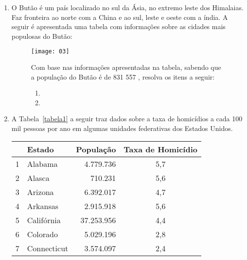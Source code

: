 \documentclass[oneside,a4paper,12pt]{article}
\begin{document}
\begin{enumerate}

\item O Butão é um país localizado no sul da Ásia, no extremo leste dos Himalaias. Faz fronteira ao norte com a China e ao sul, leste e oeste com a índia. A seguir é apresentada uma tabela com informações sobre as cidades mais populosas do Butão:

\begin{figure}[!hbt]
\begin{multicols}{2}
\texttt{[image: 03]}

\columnbreak
Com base nas informações apresentadas na tabela, sabendo que a população do Butão é de 831 557 , resolva os itens a seguir:
\begin{enumerate}
\item 

\item 
\end{enumerate}

\end{multicols}
\end{figure}

\item A Tabela~\ref{tabela1} a seguir traz dados sobre a taxa de homicídios a cada 100 mil pessoas por ano em algumas unidades federativas dos Estados Unidos.

\begin{table}[htb]
\center
\begin{tabular}{p{1cm}lrc}
\hline 
 & \textbf{Estado} & \textbf{População} & \textbf{Taxa de Homicídio} \\ 
\hline 
1 & Alabama & 4.779.736 & 5,7 \\ 

2 & Alasca & 710.231 & 5,6 \\ 
 
3 & Arizona & 6.392.017 & 4,7 \\ 
 
4 & Arkansas & 2.915.918 & 5,6 \\ 

5 & Califórnia & 37.253.956 & 4,4 \\ 

6 & Colorado & 5.029.196 & 2,8 \\ 

7 & Connecticut & 3.574.097 & 2,4 \\ 


\end{tabular}
\end{table}
\end{enumerate}
\end{document}
